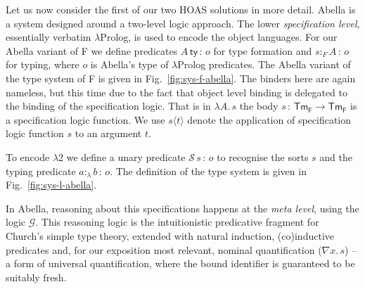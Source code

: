 \documentclass[a4paper,UKenglish]{lipics-v2016}
\newcommand{\ms}{\,}
\newcommand{\mrel}[1]{\mathrel{\ms #1 \ms}}
\newcommand{\OF}{\mrel{:}}
\newcommand{\SysL}{$\lambda$2\xspace}
\newcommand{\TmF}{\ensuremath{\mathsf{Tm_{F}}}}
\newcommand{\istyFh}[1]{\ensuremath{#1\ms\mathsf{ty}}}
\newcommand{\typingFh}[2]{\ensuremath{#1 \mathbin{:_{F}} #2}}
\newcommand{\sortLh}[1]{\ensuremath{\mathcal{S}\ms#1}}
\newcommand{\typingLh}[2]{\ensuremath{#1 \mathbin{:_{\lambda}} #2}}
\newcommand{\lpApp}[2]{#1\langle#2\rangle}
\newcommand{\Lam}[1]{\ensuremath{\lambda #1.\,}}
\theoremstyle{plain}
\begin{document}
Let us now consider the first of our two HOAS solutions in more detail.
Abella is a system designed around a two-level logic approach.
The lower \emph{specification level}, essentially verbatim $\lambda$Prolog, is used to encode the object languages.
For our Abella variant of F we define predicates $\istyFh{A} \OF o$ for type formation and $\typingFh{s}{A} \OF o$ for typing, where $o$ is Abella's type of $\lambda$Prolog predicates.
The Abella variant of the type system of F is given in Fig.~\ref{fig:sys-f-abella}.
The binders here are again nameless, but this time due to the fact that object level binding is delegated to the binding of the specification logic.
That is in $\Lam{A}{s}$ the body $s \OF \TmF \to \TmF$ is a specification logic function.
We use $\lpApp{s}{t}$ denote the application of specification logic function $s$ to an argument $t$.

To encode \SysL we define a unary predicate $\sortLh{s} \OF o$ to recognise the sorts $s$ and the typing predicate $\typingLh{a}{b} \OF o$.
The definition of the type system is given in Fig.~\ref{fig:sys-l-abella}.

In Abella, reasoning about this specifications happens at the \emph{meta level}, using the logic $\mathcal{G}$.
This reasoning logic is the intuitionistic predicative fragment for Church's simple type theory, extended with natural induction, (co)inductive predicates and, for our exposition most relevant, nominal quantification ($\nabla x . \ms s$) -- a form of universal quantification, where the bound identifier is guaranteed to be suitably fresh.
\end{document}
